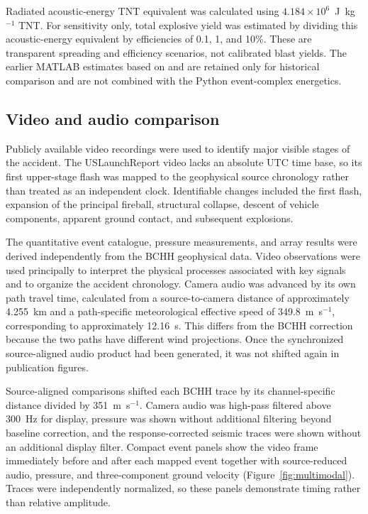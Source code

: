 \documentclass[]{seismica}
\begin{document}
Radiated acoustic-energy TNT equivalent was calculated using
$4.184\times10^6$~J~kg$^{-1}$ TNT. For sensitivity only, total explosive yield
was estimated by dividing this acoustic-energy equivalent by efficiencies of
0.1, 1, and 10\%. These are transparent spreading and efficiency scenarios,
not calibrated blast yields. The earlier MATLAB estimates based on
\citet{johnson_aster_2005} and \citet{kanamori_1977} are retained only for
historical comparison and are not combined with the Python event-complex
energetics.

\subsection{Video and audio comparison}

Publicly available video recordings were used to identify major visible stages
of the accident. The USLaunchReport video lacks an absolute UTC time base, so
its first upper-stage flash was mapped to the geophysical source chronology
rather than treated as an independent clock. Identifiable changes included the
first flash, expansion of the principal fireball, structural collapse, descent
of vehicle components, apparent ground contact, and subsequent explosions.

The quantitative event catalogue, pressure measurements, and array results were
derived independently from the BCHH geophysical data. Video observations were
used principally to interpret the physical processes associated with key
signals and to organize the accident chronology. Camera audio was advanced by
its own path travel time, calculated from a source-to-camera distance of
approximately 4.255~km and a path-specific meteorological effective speed of
349.8~m~s$^{-1}$, corresponding to approximately 12.16~s. This differs from
the BCHH correction because the two paths have different wind projections.
Once the synchronized source-aligned audio product had been generated, it was
not shifted again in publication figures.

Source-aligned comparisons shifted each BCHH trace by its channel-specific
distance divided by 351~m~s$^{-1}$. Camera audio was high-pass filtered above
300~Hz for display, pressure was shown without additional filtering beyond
baseline correction, and the response-corrected seismic traces were shown
without an additional display filter.
Compact event panels show the video frame immediately before and after each
mapped event together with source-reduced audio, pressure, and three-component
ground velocity (Figure~\ref{fig:multimodal}). Traces were independently
normalized, so these panels demonstrate timing rather than relative amplitude.
\end{document}
